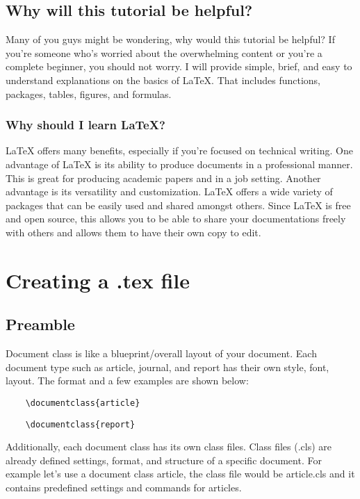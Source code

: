 \documentclass[12pt,journal,compsoc]{IEEEtran}
\begin{document}

\subsection{Why will this tutorial be helpful?}
Many of you guys might be wondering, why would this tutorial be helpful? If you're someone who's worried about the overwhelming content or you're a complete beginner, you should not worry. I will provide simple, brief, and easy to understand explanations on the basics of \LaTeX{}. That includes functions, packages, tables, figures, and formulas. 


\subsubsection{\textbf{Why should I learn \LaTeX{}?}}
\LaTeX{} offers many benefits, especially if you're focused on technical writing. One advantage of \LaTeX{} is its ability to produce documents in a professional manner. This is great for producing academic papers and in a job setting. Another advantage is its versatility and customization. \LaTeX{} offers a wide variety of packages that can be easily used and shared amongst others. Since \LaTeX{} is free and open source, this allows you to be able to share your documentations freely with others and allows them to have their own copy to edit. 

\section{Creating a .tex file}

\subsection{Preamble}
Document class is like a blueprint/overall layout of your document. Each document type such as article, journal, and report has their own style, font, layout. The format and a few examples are shown below:
\begin{verbatim}
    \documentclass{article}
\end{verbatim}
\begin{verbatim}
    \documentclass{report}
\end{verbatim}
Additionally, each document class has its own class files. Class files (.cls) are already defined settings, format, and structure of a specific document. For example let's use a document class article, the class file would be article.cls and it contains predefined settings and commands for articles.
\end{document}

